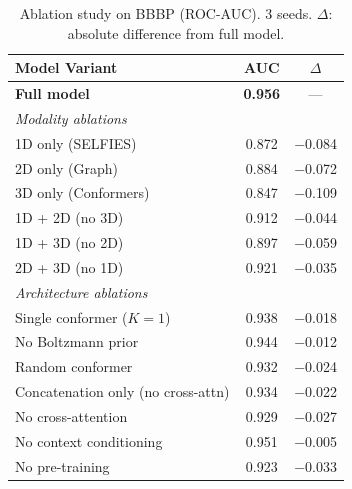 \documentclass[11pt]{article}
\begin{document}
\begin{table}[t]
    \centering
    \caption{Ablation study on BBBP (ROC-AUC). 3 seeds. $\Delta$: absolute difference from full model.}
    \label{tab:ablation_bbbp}
    \small
    \begin{tabular}{lcc}
        \toprule
        \textbf{Model Variant} & \textbf{AUC} & \textbf{$\Delta$} \\
        \midrule
        \textbf{Full model} & \textbf{0.956} & --- \\
        \midrule
        \multicolumn{3}{l}{\textit{Modality ablations}} \\
        \quad 1D only (SELFIES) & 0.872 & $-$0.084 \\
        \quad 2D only (Graph) & 0.884 & $-$0.072 \\
        \quad 3D only (Conformers) & 0.847 & $-$0.109 \\
        \quad 1D + 2D (no 3D) & 0.912 & $-$0.044 \\
        \quad 1D + 3D (no 2D) & 0.897 & $-$0.059 \\
        \quad 2D + 3D (no 1D) & 0.921 & $-$0.035 \\
        \midrule
        \multicolumn{3}{l}{\textit{Architecture ablations}} \\
        \quad Single conformer ($K\!=\!1$) & 0.938 & $-$0.018 \\
        \quad No Boltzmann prior & 0.944 & $-$0.012 \\
        \quad Random conformer & 0.932 & $-$0.024 \\
        \quad Concatenation only (no cross-attn) & 0.934 & $-$0.022 \\
        \quad No cross-attention & 0.929 & $-$0.027 \\
        \quad No context conditioning & 0.951 & $-$0.005 \\
        \quad No pre-training & 0.923 & $-$0.033 \\
        \bottomrule
    \end{tabular}
\end{table}
\end{document}
